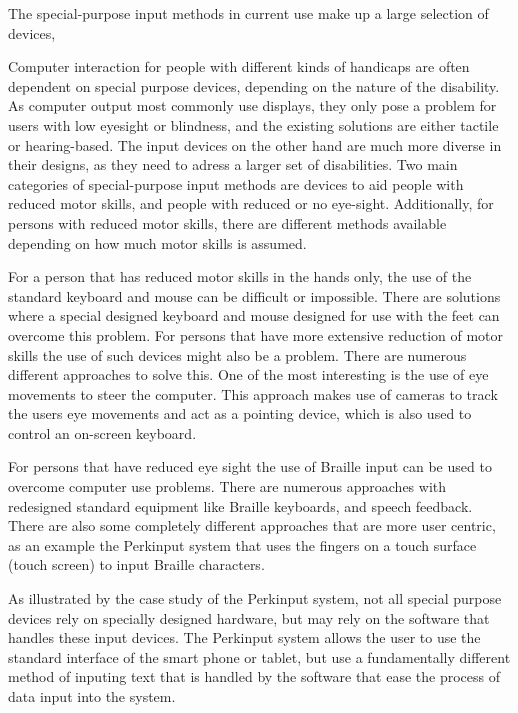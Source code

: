 The special-purpose input methods in current use make up a large selection of devices, 

Computer interaction for people with different kinds of handicaps are often dependent on special purpose devices, depending on the nature of the disability. As computer output most commonly use displays, they only pose a problem for users with low eyesight or blindness, and the existing solutions are either tactile or hearing-based. The input devices on the other hand are much more diverse in their designs, as they need to adress a larger set of disabilities. Two main categories of special-purpose input methods are devices to aid people with reduced motor skills, and people with reduced or no eye-sight. Additionally, for persons with reduced motor skills, there are different methods available depending on how much motor skills is assumed.


For a person that has reduced motor skills in the hands only, the use of the standard keyboard and mouse can be difficult or impossible. There are solutions where a special designed keyboard and mouse designed for use with the feet can overcome this problem.
For persons that have more extensive reduction of motor skills the use of such devices might also be a problem. There are numerous different approaches to solve this. One of the most interesting is the use of eye movements to steer the computer. This approach makes use of cameras to track the users eye movements and act as a pointing device, which is also used to control an on-screen keyboard. 

For persons that have reduced eye sight the use of Braille input can be used to overcome computer use problems. There are numerous approaches with redesigned standard equipment like Braille keyboards, and speech feedback. There are also some completely different approaches that are more user centric, as an example the Perkinput system that uses the fingers on a touch surface (touch screen) to input Braille characters.

As illustrated by the case study of the Perkinput system, not all special purpose devices rely on specially designed hardware, but may rely on the software that handles these input devices. The Perkinput system allows the user to use the standard interface of the smart phone or tablet, but use a fundamentally different method of inputing text that is handled by the software that ease the process of data input into the system.

